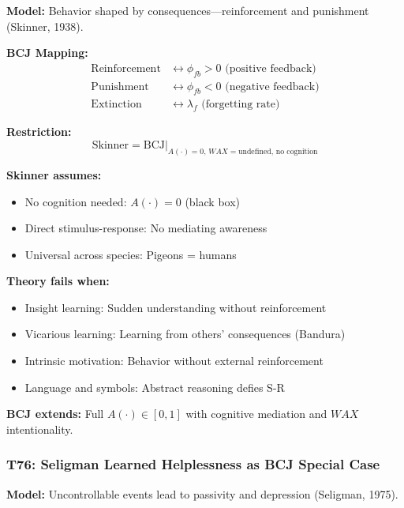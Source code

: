 \textbf{Model:} Behavior shaped by consequences---reinforcement and punishment (Skinner, 1938).

\textbf{BCJ Mapping:}
\begin{align}
\text{Reinforcement} &\leftrightarrow \phi_{fb} > 0 \text{ (positive feedback)} \\
\text{Punishment} &\leftrightarrow \phi_{fb} < 0 \text{ (negative feedback)} \\
\text{Extinction} &\leftrightarrow \lambda_f \text{ (forgetting rate)}
\end{align}

\textbf{Restriction:}
\begin{equation}
\text{Skinner} = \text{BCJ} \big|_{A(\cdot) = 0, \, WAX = \text{undefined}, \, \text{no cognition}}
\end{equation}

\begin{tcolorbox}[colback=red!5!white, colframe=red!75!black,
    title=Boundary Condition: Where Skinner Fails]
\textbf{Skinner assumes:}
\begin{itemize}[nosep]
\item No cognition needed: $A(\cdot) = 0$ (black box)
\item Direct stimulus-response: No mediating awareness
\item Universal across species: Pigeons = humans
\end{itemize}

\textbf{Theory fails when:}
\begin{itemize}[nosep]
\item Insight learning: Sudden understanding without reinforcement
\item Vicarious learning: Learning from others' consequences (Bandura)
\item Intrinsic motivation: Behavior without external reinforcement
\item Language and symbols: Abstract reasoning defies S-R
\end{itemize}

\textbf{BCJ extends:} Full $A(\cdot) \in [0,1]$ with cognitive mediation and $WAX$ intentionality.
\end{tcolorbox}

\subsubsection*{T76: Seligman Learned Helplessness as BCJ Special Case}

\textbf{Model:} Uncontrollable events lead to passivity and depression (Seligman, 1975).

